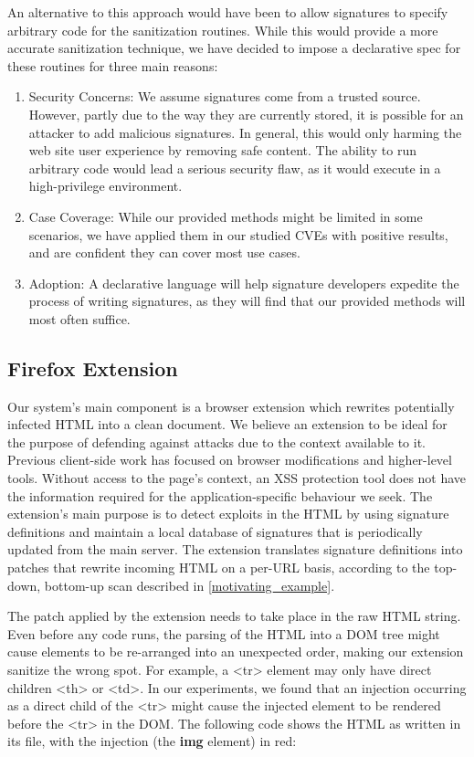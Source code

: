 An alternative to this approach would have been to allow signatures to specify arbitrary code for the sanitization routines. While this would provide a more accurate sanitization technique, we have decided to impose a declarative spec for these routines for three main reasons:
\begin{enumerate} 
	\item Security Concerns: We assume signatures come from a trusted source. However, partly due to the way they are currently stored, it is possible for an attacker to add malicious signatures. In general, this would only harming the web site user experience by removing safe content. The ability to run arbitrary code would lead a serious security flaw, as it would execute in a high-privilege environment.
	\item Case Coverage: While our provided methods might be limited in some scenarios, we have applied them in our studied CVEs with positive results, and are confident they can cover most use cases.
	\item Adoption: A declarative language will help signature developers expedite the process of writing signatures, as they will find that our provided methods will most often suffice.
\end{enumerate}
 
 \subsection{Firefox Extension} \label{firefox_extension}
 Our system's main component is a browser extension which rewrites potentially infected HTML into a clean document. We believe an extension to be ideal for the purpose of defending against attacks due to the context available to it. Previous client-side work has focused on browser modifications and higher-level tools. Without access to the page's context, an XSS protection tool does not have the information required for the application-specific behaviour we seek. The extension's main purpose is to detect exploits in the HTML by using signature definitions and maintain a local database of signatures that is periodically updated from the main server. The extension translates signature definitions into patches that rewrite incoming HTML on a per-URL basis, according to the top-down, bottom-up scan described in \autoref{motivating_example}. 

The patch applied by the extension needs to take place in the raw HTML string. Even before any code runs, the parsing of the HTML into a DOM tree might cause elements to be re-arranged into an unexpected order, making our extension sanitize the wrong spot. For example, a <tr> element may only have direct children <th> or <td>. In our experiments, we found that an injection occurring as a direct child of the <tr> might cause the injected element to be rendered before the <tr> in the DOM. The following code shows the HTML as written in its file, with the injection (the \textbf{img} element) in red:

